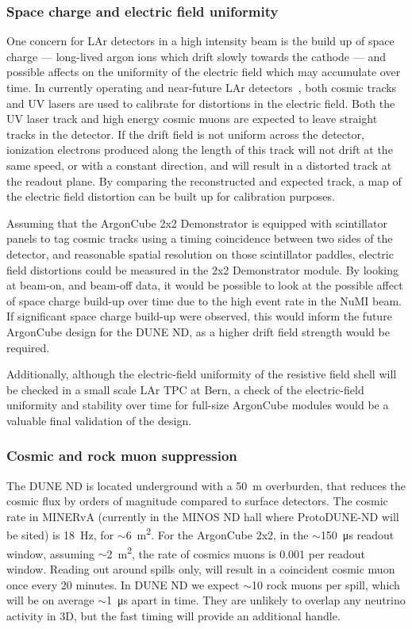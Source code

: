 \subsubsection{Space charge and electric field uniformity}
\label{sec:efield}
One concern for LAr detectors in a high intensity beam is the build up of space charge --- long-lived argon ions which drift slowly towards the cathode --- and possible affects on the uniformity of the electric field which may accumulate over time. In currently operating and near-future LAr detectors~\cite{Ereditato:2014lra, Antonello:2015lea}, both cosmic tracks and UV lasers are used to calibrate for distortions in the electric field. Both the UV laser track and high energy cosmic muons are expected to leave straight tracks in the detector. If the drift field is not uniform across the detector, ionization electrons produced along the length of this track will not drift at the same speed, or with a constant direction, and will result in a distorted track at the readout plane. By comparing the reconstructed and expected track, a map of the electric field distortion can be built up for calibration purposes.

Assuming that the ArgonCube 2x2 Demonstrator is equipped with scintillator panels to tag cosmic tracks using a timing coincidence between two sides of the detector, and reasonable spatial resolution on those scintillator paddles, electric field distortions could be measured in the 2x2 Demonstrator module. By looking at beam-on, and beam-off data, it would be possible to look at the possible affect of space charge build-up over time due to the high event rate in the NuMI beam. If significant space charge build-up were observed, this would inform the future ArgonCube design for the DUNE ND, as a higher drift field strength would be required.

Additionally, although the electric-field uniformity of the resistive field shell will be checked in a small scale LAr TPC at Bern, a check of the electric-field uniformity and stability over time for full-size ArgonCube modules would be a valuable final validation of the design.

\subsubsection{Cosmic and rock muon suppression}
\label{sec:cosmic-suppression}

The DUNE ND is located underground with a \SI{50}{\metre} overburden, that reduces the cosmic flux by orders of magnitude compared to surface detectors. The cosmic rate in MINERvA (currently in the MINOS ND hall where ProtoDUNE-ND will be sited) is \SI{18}{\hertz}, for $\sim$\SI{6}{\metre\squared}. For the ArgonCube 2x2, in the $\sim$\SI{150}{\micro\second} readout window, assuming $\sim$\SI{2}{\metre\squared}, the rate of cosmics muons is 0.001 per readout window. Reading out around spills only, will result in a coincident cosmic muon once every 20 minutes.
In DUNE ND we expect $\sim$10 rock muons per spill, which will be on average $\sim$\SI{1}{\micro\second} apart in time. They are unlikely to overlap any neutrino activity in 3D, but the fast timing will provide an additional handle.

